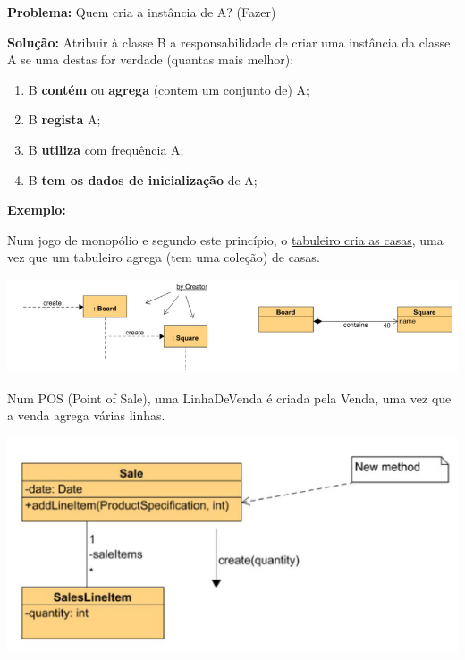 \documentclass{article}
\begin{document}
\begin{flushleft}
    \textbf{Problema:} Quem cria a instância de A? (Fazer)

    \vspace{3mm}
    \textbf{Solução:} Atribuir à classe B a responsabilidade de criar uma instância
    da classe A se uma destas for verdade (quantas mais melhor):

    \begin{enumerate}
        \item B \textbf{contém} ou \textbf{agrega} (contem um conjunto de) A;
        \item B \textbf{regista} A;
        \item B \textbf{utiliza} com frequência A;
        \item B \textbf{tem os dados de inicialização} de A;
    \end{enumerate}
\end{flushleft}

\begin{flushleft}
    \textbf{Exemplo:}

    \vspace{3mm}
    Num jogo de monopólio e segundo este princípio, o \uline{tabuleiro cria as casas}, uma vez que um tabuleiro
    agrega (tem uma coleção) de casas.

    \begin{center}
        \includegraphics[scale=0.5]{Images/10.png}
    \end{center}

    \vspace{3mm}
    Num POS (Point of Sale), uma LinhaDeVenda é criada pela Venda, uma vez que a venda agrega várias
    linhas.

    \begin{center}
        \includegraphics[scale=0.4]{Images/11.png}
    \end{center}
\end{flushleft}
\end{document}
